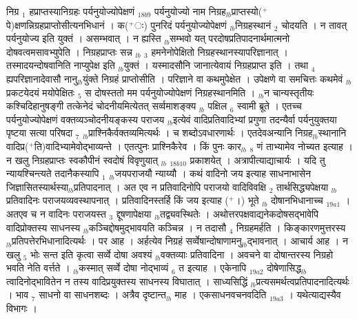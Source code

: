 \documentclass[article,12pt,a4paper]{memoir}%
\newcommand{\add}[1]{($^{+}$#1)}
\begin{document}
	  
	  \pstart \leavevmode%
	\hphantom{.}{\color{DodgerBlue3}निग्र {\tiny $_{1}$} हप्राप्तस्यानिग्रहः पर्यनुयोज्योपेक्षणं} {\tiny $_{18b9}$} पर्यनुयोज्यो नाम निग्रह{\tiny $_{lb}$}प्राप्तस्यो\add{पे}क्षणन्निग्रहप्राप्तोसीत्यनभिधानं । क\add{ः} पुनरिदं पर्यनुयोज्योपेक्षणं {\tiny $_{lb}$}निग्रहस्थानं {\tiny $_{2}$} चोदयति । न तावत् पर्यनुयोज्य इति युक्तं । असम्भवात् । न ह्यस्ति {\tiny $_{lb}$}सम्भवो यत् परदोषप्रतिपादनार्थमात्मनो दोषवत्वमसावभ्युपेति । निग्रहप्राप्तः सन्न {\tiny $_{lb}$} \leavevmode{} {\tiny $_{3}$} हमनेनोपेक्षितो निग्रहस्थानस्यापरिज्ञानात् । तस्मादयन्दोषवानिति नाप्युपेक्ष इति {\tiny $_{lb}$}युक्तं । यस्मादसौनि जानात्येवायं निग्रहप्राप्त इति । तथा {\tiny $_{4}$} ह्यपरिज्ञानादेवासौ नानु{\tiny $_{lb}$}युंक्ते निग्रहं प्राप्तोसीति । परिज्ञाने वा कथमुपेक्षेत । उपेक्षणे वा समचित्तः कथमेवं {\tiny $_{lb}$}प्रकटयेदयं मयोपेक्षितः {\tiny $_{5}$} स दोषस्ततो मम पर्यनुयोज्योपेक्षणं निग्रहस्थानमिति । {\tiny $_{lb}$}न चान्यस्तृतीयः कश्चिदिहानुषङ्गी तत्केनेदं चोदनीयमित्येतत् सर्व्वमाशङ्क्य {\tiny $_{lb}$} {\color{DodgerBlue3}पक्षिल {\tiny $_{6}$}} स्वामी ब्रूते । एतच्च पर्यनुयोज्योपेक्षणं वक्तव्यञ्चोदनीयङ्कस्य पराजय {\tiny $_{lb}$}इत्येवं वादिप्रतिवादिभ्यां प्रगुणा तदन्यैर्वा पर्यनुयुक्तया पृष्टया सत्या परिषदा {\tiny $_{7}$} {\tiny $_{lb}$}प्राश्निकैर्वक्तव्यमित्यर्थः । च शब्दोऽवधारणार्थः । एतदेवअन्यानि निग्रह{\tiny $_{lb}$}स्थानानि वादिप्र\add{ति}वादिभ्यामेवोद्भाव्यन्ते । एतत्पुनः प्राश्निकैरेव । किं पुनः कार{\tiny $_{lb}$} {\tiny $_{8}$} \leavevmode{} णं ताभ्यामेव नोच्यत इत्याह । न {\color{DodgerBlue3}खलु निग्रहप्राप्तः स्वकौपीनं} स्वदोषं {\color{DodgerBlue3}विवृणुयात्} {\tiny $_{lb}$} {\tiny $_{18b10}$} प्रकाशयेत् । अत्रापीत्याद्याचार्यः । यदि तु न्यायश्चिन्त्यते तदानैकस्यापि {\tiny $_{1}$} {\tiny $_{lb}$}जयपराजयौ न्याय्यौ । कथं वादिनो जय इत्याह साधनाभासेन जिज्ञासितस्यार्थस्या{\tiny $_{lb}$}प्रतिपादनात् । अत एव न प्रतिवादिनोपि पराजयो वादिविवक्षि {\tiny $_{2}$} तार्थसिद्ध्यपेक्षया {\tiny $_{lb}$}प्रतिवादिनः पराजयव्यवस्थापनात् । प्रतिवादिनस्तर्हि किं जय इत्याह \add{।} भूते {\tiny $_{lb}$} {\color{DodgerBlue3}दोषानभिधानाच्च} {\tiny $_{19a1}$} । अतएव च न वादिनः पराजयस्त {\tiny $_{3}$} द्दूषणापेक्षया {\tiny $_{lb}$}तद्व्यवस्थितेः । अथोत्तरपक्षवाद्यनेकदोषसद्भावेपि वादिप्रोक्तस्य साधनस्य {\tiny $_{lb}$}कञ्चिद्दोषमुद्भावयति कञ्चिन्न । न तदासौ {\tiny $_{4}$} निग्रहमर्हति । किङ्कारणमुत्तरस्य {\tiny $_{lb}$}प्रतिपत्तेरभिधानादित्यर्थः । पर आह । अर्हत्येव निग्रहं सर्व्वेषान्दोषाणामनु{\tiny $_{lb}$}द्भावनात् । आचार्य आह । {\color{DodgerBlue3}न खलु {\tiny $_{5}$} भोः सन्त इति कृत्वा सर्व्वे दोषा अवश्यं {\tiny $_{lb}$}वक्तव्याः प्रतिवादिना} । अवचने वा दोषान्तरस्य निग्रहो भवति नेति वर्त्तते । {\tiny $_{lb}$}कस्मात् सर्व्वे दोषा नोद्भाव्यं {\tiny $_{6}$} त इत्याह । {\color{DodgerBlue3}एकेनापि} {\tiny $_{19a2}$} दोषेणासिद्ध{\tiny $_{lb}$}त्वादिनोद्भावितेन न तस्य वादिप्रयुक्तस्य साधनस्य विघातात् । साध्यसिद्धिं {\tiny $_{lb}$}प्रत्यसमर्थत्वप्रतिपादनादित्यर्थः । भाव {\tiny $_{7}$} साधनो वा साधनशब्दः । अत्रैव दृष्टान्त{\tiny $_{lb}$} \leavevmode{} माह । {\color{DodgerBlue3}एकसाधनवचनवदिति} {\tiny $_{19a3}$} । यथेत्याद्यस्यैव विभागः । 
\end{document}
